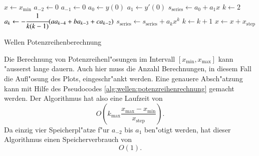 \begin{algorithm}
	\begin{algorithmic}[1]
		\State $x \gets x_{\text{min}}$
			\State $a_{-2} \gets 0$
			\State $a_{-1} \gets 0$
			\State $a_0 \gets y(0)$
			\State $a_1 \gets y'(0)$
			\State $s_{\text{series}} \gets a_0 + a_1x$
			\State $k \gets 2$
				\State $a_k \gets -\cfrac{1}{k(k-1)}			
				(aa_{k-4}+ba_{k-3}+ca_{k-2})$
				\State $s_{\text{series}} \gets s_{\text{series}} + a_k x^k$
				\State $k \gets k + 1$
			\EndFor
			\State $x \gets x + x_{\text{step}}$
		\EndFor
	\end{algorithmic}
	\caption{Wellen Potenzreihenberechnung} 
	\label{alg:wellen:potenzreihenrechnung}
\end{algorithm}

Die Berechnung von Potenzreihenl"osungen im Intervall
$[x_{\text{min}},x_{\text{max}}]$ kann "ausserst lange dauern. Auch hier muss 
die Anzahl Berechnungen, in diesem Fall die Aufl"osung des Plots, 
eingeschr"ankt werden. Eine genauere Absch"atzung kann mit Hilfe des 
Pseudocodes \ref{alg:wellen:potenzreihenrechnung} gemacht werden. Der 
Algorithmus hat also eine Laufzeit von
\begin{equation*}
	O
	\left(
		k_{\text{max}}\frac{x_{\text{max}}-x_{\text{min}}}{x_{\text{step}}}
	\right).
\end{equation*}
Da einzig vier Speicherpl"atze f"ur $a_{-2}$ bis $a_1$ ben"otigt werden, hat 
dieser Algorithmus einen Speicherverbrauch von
\begin{equation*}
	O
	\left(
		1
	\right).
\end{equation*}